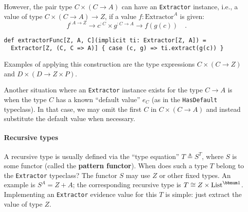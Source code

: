 However, the pair type $C\times\left(C\rightarrow A\right)$ can have
an \lstinline!Extractor! instance, i.e., a value of type $C\times\left(C\rightarrow A\right)\rightarrow Z$,
if a value $f:\text{Extractor}^{A}$ is given:
\[
f^{:A\rightarrow Z}\rightarrow c^{:C}\times g^{:C\rightarrow A}\rightarrow f(g(c))\quad.
\]
\begin{lstlisting}
def extractorFunc[Z, A, C](implicit ti: Extractor[Z, A]) =
  Extractor[Z, (C, C => A)] { case (c, g) => ti.extract(g(c)) }
\end{lstlisting}
Examples of applying this construction are the type expressions $C\times\left(C\rightarrow Z\right)$
and $D\times\left(D\rightarrow Z\times P\right)$.

Another situation where an \lstinline!Extractor! instance exists
for the type $C\rightarrow A$ is when the type $C$ has a known \textsf{``}default
value\textsf{''} $e_{C}$ (as in the \lstinline!HasDefault! typeclass). In
that case, we may omit the first $C$ in $C\times(C\rightarrow A)$
and instead substitute the default value when necessary.

\paragraph{Recursive types}

A recursive type is usually defined via the \textsf{``}type equation\textsf{''} $T\triangleq S^{T}$,
where $S$ is some functor (called the \textbf{pattern functor}).
When does such a type $T$ belong to the \lstinline!Extractor! typeclass?
The functor $S$ may use $Z$ or other fixed types. An example is
$S^{A}=Z+A$; the corresponding recursive type is $T\cong Z\times\text{List}^{\bbnum 1}$.
Implementing an \lstinline!Extractor! evidence value for this $T$
is simple: just extract the value of type $Z$.

